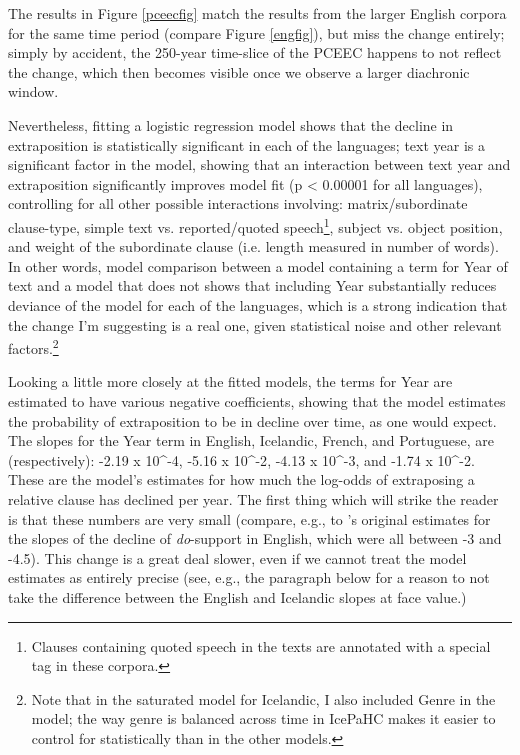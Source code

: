 \noindent The results in Figure \ref{pceecfig} match the results from the larger English corpora for the same time period (compare Figure \ref{engfig}), but miss the change entirely; simply by accident, the 250-year time-slice of the PCEEC happens to not reflect the change, which then becomes visible once we observe a larger diachronic window.

Nevertheless, fitting a logistic regression model shows that the decline in extraposition is statistically significant in each of the languages; text year is a significant factor in the model, showing that an interaction between text year and extraposition significantly improves model fit (p < 0.00001 for all languages), controlling for all other possible interactions involving: matrix/subordinate clause-type, simple text vs. reported/quoted speech\footnote{Clauses containing quoted speech in the texts are annotated with a special tag in these corpora.}, subject vs. object position, and weight of the subordinate clause (i.e. length measured in number of words). In other words, model comparison between a model containing a term for Year of text and a model that does not shows that including Year substantially reduces deviance of the model for each of the languages, which is a strong indication that the change I'm suggesting is a real one, given statistical noise and other relevant factors.\footnote{Note that in the saturated model for Icelandic, I also included Genre in the model; the way genre is balanced across time in IcePaHC makes it easier to control for statistically than in the other models.}

Looking a little more closely at the fitted models, the terms for Year are estimated to have various negative coefficients, showing that the model estimates the probability of extraposition to be in decline over time, as one would expect. The slopes for the Year term in English, Icelandic, French, and Portuguese, are (respectively): -2.19 x 10^{-4}, -5.16 x 10^{-2}, -4.13 x 10^{-3}, and -1.74 x 10^{-2}. These are the model's estimates for how much the log-odds of extraposing a relative clause has declined per year. The first thing which will strike the reader is that these numbers are very small (compare, e.g., to \citealt{kroch1989}'s original estimates for the slopes of the decline of \textsl{do}-support in English, which were all between -3 and -4.5). This change is a great deal slower, even if we cannot treat the model estimates as entirely precise (see, e.g., the paragraph below for a reason to not take the difference between the English and Icelandic slopes at face value.)

